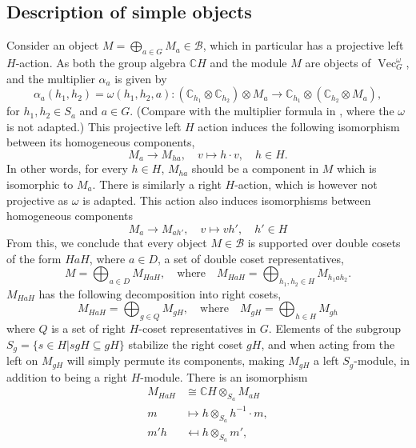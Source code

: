 \documentclass[11pt]{book}
\theoremstyle{Rem}
\theoremstyle{definition}
\numberwithin{equation}{section}
\newcommand\Vect{\operatorname{Vec}}
\newcommand\CC{\mathbb C}
\newcommand\B{\mathcal B}
\begin{document}
\subsection{Description of simple objects}\label{simples} Consider an object $M=\bigoplus_{a\in G} M_a\in \B$, which in particular has a projective left $H$-action. As both the group algebra $\CC H$ and the module $M$ are objects of $\Vect^\omega_G$, and the multiplier $\alpha_a$ is given by \begin{equation}\label{alpha}
	\alpha_a(h_1, h_2) = \omega(h_1, h_2, a) :(\CC_{h_1}\otimes \CC_{h_2}) \otimes M_{a} \rightarrow \CC_{h_1} \otimes (\CC_{h_2} \otimes M_{a}),
\end{equation} for $h_1, h_2 \in S_a$ and $a\in G$. (Compare with the multiplier formula in \cite{Ost:MCDDFG}, where the $\omega$ is not adapted.) This projective left $H$ action induces the following isomorphism between its homogeneous components,
\begin{equation}\label{delta}
	 M_a \rightarrow M_{ha}, \quad  v\mapsto h\cdot v, \quad h\in H.
\end{equation}In other words, for every $h\in H$, $M_{ha}$ should be a component in $M$ which is isomorphic to $M_a$. There is similarly a right $H$-action, which is however not projective as $\omega$ is adapted. This action also induces isomorphisms between homogeneous components \begin{equation}\label{psi}
	 M_a \rightarrow M_{ah'}, \quad  v\mapsto vh', \quad h'\in H
\end{equation}
From this, we conclude that every object $M \in \B$ is supported over double cosets of the form $HaH$, where $a\in D$, a set of double coset representatives, \begin{equation}\label{phi}
	M= \bigoplus_{a\in D} M_{HaH}, \quad \text{where}\quad M_{HaH} = \bigoplus_{h_1, h_2 \in H} M_{h_1ah_2}.
\end{equation} $M_{HaH}$ has the following decomposition into right cosets,
\begin{equation}
	M_{HaH}= \bigoplus_{g\in Q } M_{gH}, \quad\text{where}\quad M_{gH} = \bigoplus_{h\in H} M_{gh}
\end{equation} where $Q$ is a set of right $H$-coset representatives in $G$. Elements of the subgroup $S_g=\{s\in H | sgH \subseteq gH\}$ stabilize the right coset $gH$, and when acting from the left on $M_{gH}$ will simply permute its components, making $M_{gH}$ a left $S_g$-module, in addition to being a right $H$-module. 
There is an isomorphism \begin{align}\label{induced}
 M_{HaH} &\cong  \mathbb{C}H  \otimes_{S_a} M_{aH}\\m &\mapsto h \otimes_{S_a} h^{-1}\cdot m,\nonumber\\  m'h &\mapsfrom h\otimes_{S_a} m',\nonumber
\end{align} 
\end{document}
